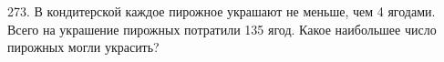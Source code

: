 273. В кондитерской каждое пирожное украшают не меньше, чем 4 ягодами. Всего на украшение пирожных потратили 135 ягод. Какое наибольшее число пирожных могли украсить?\\

